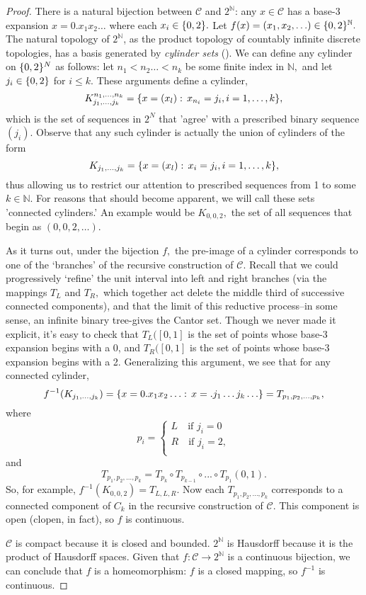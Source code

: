 \documentclass[12pt, letterpaper, oneside]{book}
\newcommand{\N}{\mathbb{N}}
\DeclarePairedDelimiter{\set}{\lbrace}{\rbrace}
\theoremstyle{plain}
\theoremstyle{definition}
\theoremstyle{remark}
\begin{document}
\begin{proof}
There is a natural bijection between $\mathcal{C}$ and $2^\N$: any $x \in \mathcal{C}$ has a base-3 expansion $x = 0.x_1x_2\ldots$ where each $x_i \in \set{0,2}.$ Let $f(x) = (x_1,x_2, \ldots) \in \set{0,2}^\N.$ The natural topology of $2^\N$, as the product topology of countably infinite discrete topologies, has a basis generated by \textit{cylinder sets} (\cite{MB02}). We can define any cylinder on $\set{0,2}^N$ as follows: let $n_1 < n_2 \ldots < n_k$ be some finite index in $\N,$ and let $j_i \in \set{0,2}$ for $i \leq k.$ These arguments define a cylinder, 
\[
K^{n_1,\ldots,n_k}_{j_1,\ldots,j_k} = \set{x = (x_l): \,  x_{n_i} = j_i, i = 1, \ldots , k},
\]
which is the set of sequences in $2^N$ that 'agree' with a prescribed binary sequence $(j_i).$ Observe that any such cylinder is actually the union of cylinders of the form
\[
K_{j_1,\ldots,j_k} = \set{x = (x_l): \,  x_i = j_i, i = 1, \ldots , k},
\]
thus allowing us to restrict our attention to prescribed sequences from 1 to some $k \in \N.$  For reasons that should become apparent, we will call these sets 'connected cylinders.' An example would be $K_{0,0,2},$ the set of all sequences that begin as $(0,0,2,\ldots).$ 

As it turns out, under the bijection $f,$ the pre-image of a cylinder corresponds to one of the `branches' of the recursive construction of $\mathcal{C}.$ Recall that we could progressively `refine' the unit interval into left and right branches (via the mappings $T_L$ and $T_R,$ which together act delete the middle third of successive connected components), and that the limit of this reductive process--in some sense, an infinite binary tree-gives the Cantor set. Though we never made it explicit, it's easy to check that $T_L([0,1]$ is the set of points whose base-3 expansion begins with a 0, and $T_R([0,1]$ is the set of points whose base-3 expansion begins with a 2. Generalizing this argument, we see that for any connected cylinder,
\[
f^{-1}(K_{j_1,\ldots,j_k}) = \set{x = 0.x_1x_2\ldots:\, x = .j_1 \ldots j_k\ldots} = T_{p_1, p_2, \ldots , p_k},
\]
where
\[
p_i = 
\begin{cases}
L \quad \text{if $j_i = 0$} \\
R \quad \text{if $j_i = 2$}, \\
\end{cases}
\]
and
\[
T_{p_1, p_2, \ldots , p_k} = T_{p_k} \circ T_{p_{k-1}}\circ ...\circ T_{p_1}(0,1).
\]
So, for example, $f^{-1}(K_{0,0,2}) = T_{L,L,R}.$ Now each $T_{p_1, p_2, \ldots , p_k}$ corresponds to a connected component of $C_k$ in the recursive construction of $\mathcal{C}.$ This component is open (clopen, in fact), so $f$ is continuous.

$\mathcal{C}$ is compact because it is closed and bounded. $2^{\N}$ is Hausdorff because it is the product of Hausdorff spaces. Given that $f: \mathcal{C} \to 2^{\N}$ is a continuous bijection, we can conclude that $f$ is a homeomorphism: $f$ is a closed mapping, so $f^{-1}$ is continuous. 
\end{proof}
\end{document}
